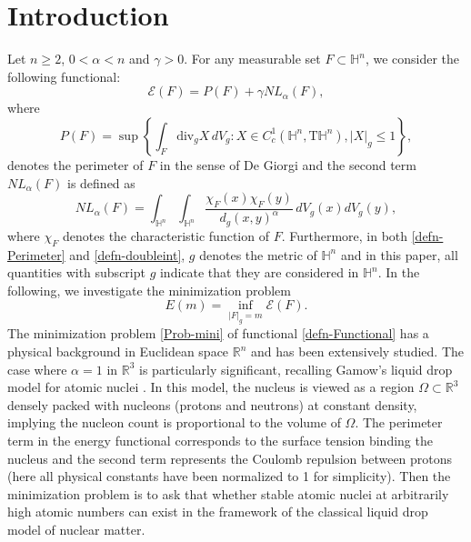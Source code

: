 \documentclass[11pt,reqno]{amsart}
\theoremstyle{definition}
\theoremstyle{remark}
\numberwithin{equation}{section}
\renewcommand{\(}{\left(}
\renewcommand{\)}{\right)}
\renewcommand{\-}{\overline}
\begin{document}
\section{Introduction}
Let $n\geq 2$, $0<\alpha<n$ and $\gamma>0$. For any measurable set $F\subset\mathbb{H}^n$, we consider the following functional:
\begin{equation}\label{defn-Functional}
	\mathcal{E}(F)=P(F)+\gamma NL_{\alpha}(F),
\end{equation}
where
\begin{equation}\label{defn-Perimeter}
 P(F)=\sup\left\{\int_{F}\mathrm{div}_g X\,dV_g:X\in C_c^1(\mathbb{H}^n,\mathrm{T}\mathbb{H}^n),|X|_g\leq 1\right\},
 \end{equation}
 denotes the perimeter of $F$ in the sense of  De Giorgi and the second term $NL_{\alpha}(F)$ is defined as
 \begin{equation}\label{defn-doubleint}
 	NL_{\alpha}(F)=\int_{\mathbb{H}^n}\int_{\mathbb{H}^n}{\frac{\chi_F(x)\chi_F(y)}{{d_g(x,y)}^{\alpha}}}\,dV_g(x)dV_g(y),
 \end{equation}
 where $\chi_F$ denotes the characteristic function of $F$. Furthermore,  in both \eqref{defn-Perimeter} and \eqref{defn-doubleint}, $g$ denotes the metric of $\mathbb{H}^n$ and in this paper, all quantities with subscript $g$ indicate that they are considered in $\mathbb{H}^n$. In the following, we investigate the minimization problem
 \begin{equation}\label{Prob-mini}
 	E(m)=\inf_{|F|_g=m}\mathcal{E}(F).
 \end{equation}
The minimization problem \eqref{Prob-mini} of functional \eqref{defn-Functional} has a physical background in Euclidean space $\mathbb{R}^n$ and has been extensively studied. The case where $\alpha=1$ in $\mathbb{R}^3$ is particularly significant, recalling Gamow's liquid drop model for atomic nuclei \cite{Gamow1930}. In this model, the nucleus is viewed as a region $\Omega\subset\mathbb{R}^3$ densely packed with nucleons (protons and neutrons) at constant density, implying the nucleon count is proportional to the volume of $\Omega$. The perimeter term in the energy functional corresponds to the surface tension binding the nucleus and the second term represents the Coulomb repulsion between protons (here all physical constants have been normalized to 1 for simplicity). Then the minimization problem is to ask that whether stable atomic nuclei at arbitrarily high atomic numbers can exist in the framework of the classical liquid drop model of nuclear matter.
\end{document}
